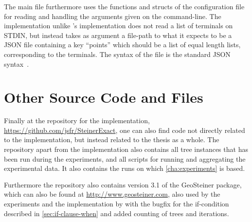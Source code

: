 The main file furthermore uses the functions and structs of the configuration
file for reading and handling the arguments given on the command-line. The
implementation unlike \citeauthor{smith1992}'s implementation does not read a
list of terminals on STDIN, but instead takes as argument a file-path to what it
expects to be a JSON file containing a key ``points'' which should be a list of
equal length lists, corresponding to the terminals. The syntax of the file is
the standard JSON syntax~\cite{ecma404}.

\section{Other Source Code and Files}
\label{sec:other-source-code}

Finally at the repository for the implementation,
\url{https://github.com/jsfr/SteinerExact}, one can also find code not directly
related to the implementation, but instead related to the thesis as a
whole. The repository apart from the implementation also contains all tree
instances that has been run during the experiments, and all scripts for running
and aggregating the experimental data. It also contains the runs on which
\cref{cha:experiments} is based.

Furthermore the repository also contains version 3.1 of the GeoSteiner package,
which can also be found at \url{http://www.geosteiner.com}, also used by the
experiments and the implementation by \textcite{smith1992} with the bugfix for
the if-condition described in \cref{sec:if-clause-when} and added counting of
trees and iterations.

